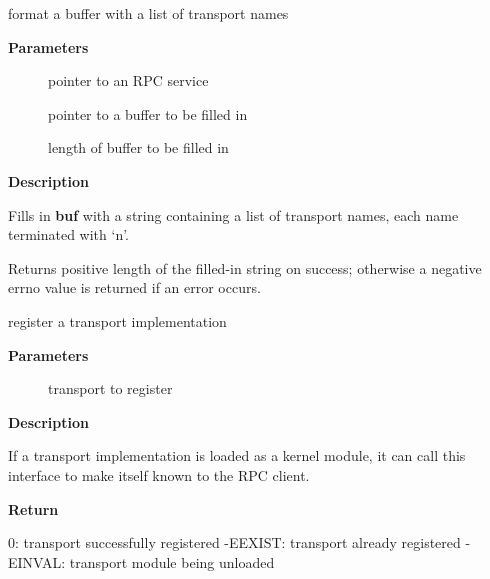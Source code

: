 \documentclass[a4paper,8pt,english]{sphinxmanual}
\begin{document}
\begin{fulllineitems}
\label{networking/kapi:c.svc_xprt_names}
format a buffer with a list of transport names

\end{fulllineitems}


\textbf{Parameters}
\begin{description}
\item[{}] \leavevmode
pointer to an RPC service

\item[{}] \leavevmode
pointer to a buffer to be filled in

\item[{}] \leavevmode
length of buffer to be filled in

\end{description}

\textbf{Description}

Fills in \textbf{buf} with a string containing a list of transport names,
each name terminated with `n'.

Returns positive length of the filled-in string on success; otherwise
a negative errno value is returned if an error occurs.

\begin{fulllineitems}
\label{networking/kapi:c.xprt_register_transport}
register a transport implementation

\end{fulllineitems}


\textbf{Parameters}
\begin{description}
\item[{}] \leavevmode
transport to register

\end{description}

\textbf{Description}

If a transport implementation is loaded as a kernel module, it can
call this interface to make itself known to the RPC client.

\textbf{Return}

0:           transport successfully registered
-EEXIST:     transport already registered
-EINVAL:     transport module being unloaded
\end{document}
